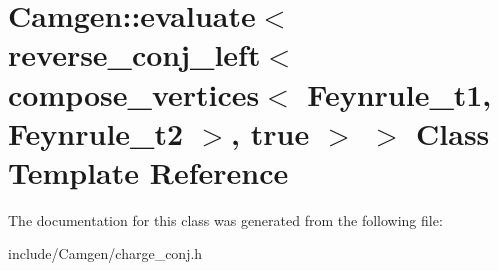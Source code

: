 \hypertarget{a00181}{\section{Camgen\-:\-:evaluate$<$ reverse\-\_\-conj\-\_\-left$<$ compose\-\_\-vertices$<$ Feynrule\-\_\-t1, Feynrule\-\_\-t2 $>$, true $>$ $>$ Class Template Reference}
\label{a00181}
}


The documentation for this class was generated from the following file\-:\begin{DoxyCompactItemize}
\item 
include/\-Camgen/charge\-\_\-conj.\-h\end{DoxyCompactItemize}

